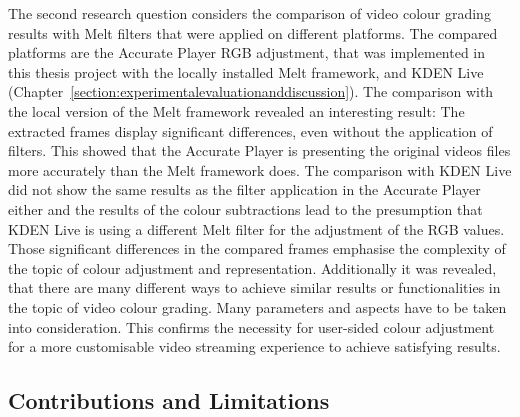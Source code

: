 \documentclass[../MasterThesis.tex]{subfiles}
\begin{document}
The second research question considers the comparison of video colour grading results with Melt filters that were applied on different platforms. The compared platforms are the Accurate Player RGB adjustment, that was implemented in this thesis project with the locally installed Melt framework, and KDEN Live (Chapter~\ref{section:experimentalevaluationanddiscussion}).
%
%
The comparison with the local version of the Melt framework revealed an interesting result: The extracted frames display significant differences, even without the application of filters. This showed that the Accurate Player is presenting the original videos files more accurately than the Melt framework does.
The comparison with KDEN Live did not show the same results as the filter application in the Accurate Player either and the results of the colour subtractions lead to the presumption that KDEN Live is using a different Melt filter for the adjustment of the RGB values.
%
Those significant differences in the compared frames emphasise the complexity of the topic of colour adjustment and representation. 
%
%
Additionally it was revealed, that there are many different ways to achieve similar results or functionalities in the topic of video colour grading. Many parameters and aspects have to be taken into consideration. This confirms the necessity for user-sided colour adjustment for a more customisable video streaming experience to achieve satisfying results. 





\subsection{Contributions and Limitations} \label{subsection:contributionslimitations}
\end{document}
